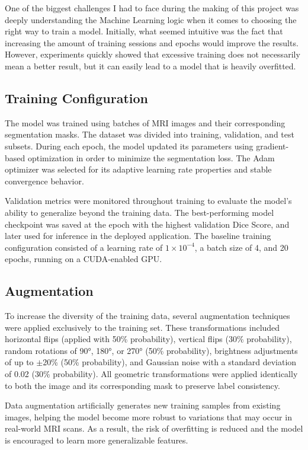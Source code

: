 \documentclass[conference]{IEEEtran}
\begin{document}
One of the biggest challenges I had to face during the making of this project was deeply understanding the Machine Learning logic when it comes to choosing the right way to train a model. Initially, what seemed intuitive was the fact that increasing the amount of training sessions and epochs would improve the results. However, experiments quickly showed that excessive training does not necessarily mean a better result, but it can easily lead to a model that is heavily overfitted.

\subsection{Training Configuration}

The model was trained using batches of MRI images and their corresponding segmentation masks. The dataset was divided into training, validation, and test subsets. During each epoch, the model updated its parameters using gradient-based optimization in order to minimize the segmentation loss. The Adam optimizer \cite{pytorch} was selected for its adaptive learning rate properties and stable convergence behavior.

Validation metrics were monitored throughout training to evaluate the model's ability to generalize beyond the training data. The best-performing model checkpoint was saved at the epoch with the highest validation Dice Score, and later used for inference in the deployed application. The baseline training configuration consisted of a learning rate of $1 \times 10^{-4}$, a batch size of 4, and 20 epochs, running on a CUDA-enabled GPU.

\subsection{Augmentation}

To increase the diversity of the training data, several augmentation techniques were applied exclusively to the training set. These transformations included horizontal flips (applied with 50\% probability), vertical flips (30\% probability), random rotations of 90°, 180°, or 270° (50\% probability), brightness adjustments of up to $\pm$20\% (50\% probability), and Gaussian noise with a standard deviation of 0.02 (30\% probability). All geometric transformations were applied identically to both the image and its corresponding mask to preserve label consistency.

Data augmentation artificially generates new training samples from existing images, helping the model become more robust to variations that may occur in real-world MRI scans. As a result, the risk of overfitting is reduced and the model is encouraged to learn more generalizable features.
\end{document}
